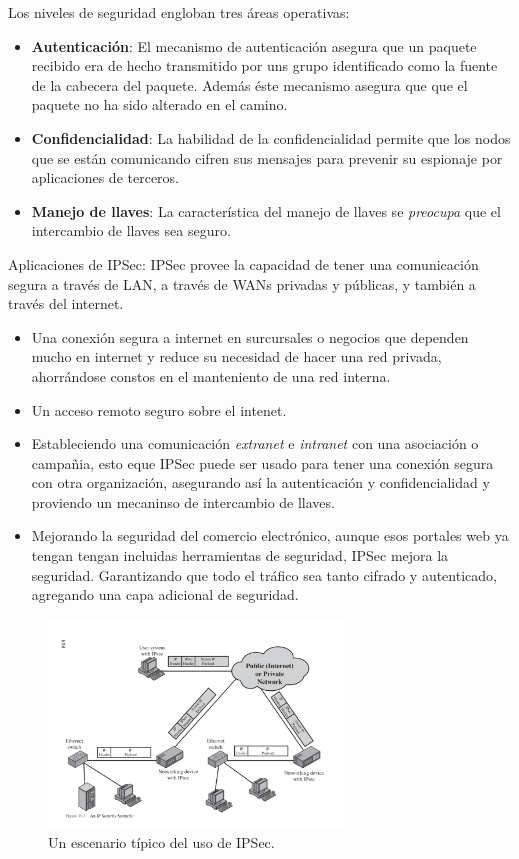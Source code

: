 \documentclass[11pt,letterpaper]{article}
\begin{document}
Los niveles de seguridad engloban tres áreas operativas:
\begin{itemize}
    \item \textbf{Autenticación}: El mecanismo de autenticación asegura que un paquete recibido era de hecho
    transmitido por uns grupo identificado como la fuente de la cabecera del paquete. Además éste
    mecanismo asegura que que el paquete no ha sido alterado en el camino.
    \item \textbf{Confidencialidad}: La habilidad de la confidencialidad permite que los nodos que se están
    comunicando cifren sus mensajes para prevenir su espionaje por aplicaciones de terceros.
    \item \textbf{Manejo de llaves}: La característica del manejo de llaves se \textit{preocupa} que el
    intercambio de llaves sea seguro.
\end{itemize}

Aplicaciones de IPSec:
IPSec provee la capacidad de tener una comunicación segura a través de LAN, a través de WANs privadas y públicas,
y también a través del internet.
\begin{itemize}
    \item Una conexión segura a internet en surcursales o negocios que dependen mucho en internet y reduce su
    necesidad de hacer una red privada, ahorrándose constos en el manteniento de una red interna.
    \item Un acceso remoto seguro sobre el intenet.
    \item Estableciendo una comunicación \textit{extranet} e \textit{intranet} con una asociación o campañia, esto
    eque IPSec puede ser usado para tener una conexión segura con otra organización, asegurando así la
    autenticación y confidencialidad y proviendo un mecaninso de intercambio de llaves.
    \item Mejorando la seguridad del comercio electrónico, aunque esos portales web ya tengan tengan incluidas
    herramientas de seguridad, IPSec mejora la seguridad. Garantizando que todo el tráfico sea tanto cifrado y
    autenticado, agregando una capa adicional de seguridad.
\end{itemize}

\begin{figure}[H]
    \centering
    \includegraphics[width=0.7\textwidth]{assets/1.png}
    \caption{Un escenario típico del uso de IPSec.}
\end{figure}
\end{document}
